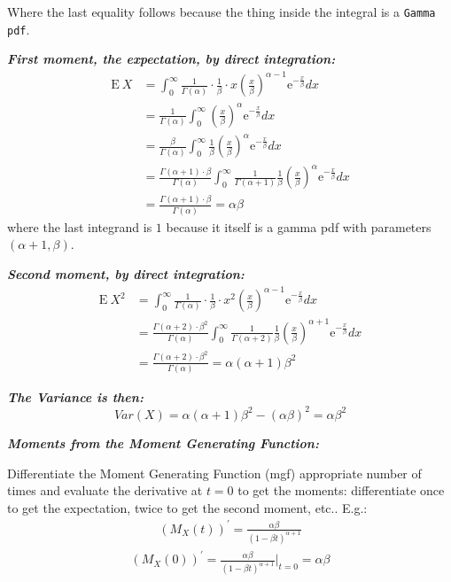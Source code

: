 \documentclass[12pt]{article}
\begin{document}
Where the last equality follows because the thing inside the integral is a \texttt{Gamma} \texttt{pdf}. 
 
 \textbf{\color{TealBlue}\emph{First moment, the expectation, by direct integration:} } 
\begin{align*}
 \mathrm{E} \: X &= \int_0^{\infty}  \frac{1}{\Gamma({\alpha})} \cdot \frac{1}{\beta} \cdot x  \left( \frac{x}{\beta}\right)^{\alpha - 1} \mathrm{e}^{-\frac{x}{\beta}} dx \\
&=   \frac{1}{\Gamma({\alpha})} \int_0^{\infty} \left( \frac{x}{\beta}\right)^{\alpha} \mathrm{e}^{-\frac{x}{\beta}} dx \\
&=   \frac{\beta}{\Gamma({\alpha})} \int_0^{\infty} \frac{1}{\beta} \left( \frac{x}{\beta}\right)^{\alpha} \mathrm{e}^{-\frac{x}{\beta}} dx \\
&=   \frac{ \Gamma({\alpha} + 1) \cdot \beta }{\Gamma({\alpha})} \int_0^{\infty} \frac{1}{\Gamma(\alpha + 1)} \frac{1}{\beta} \left( \frac{x}{\beta}\right)^{\alpha} \mathrm{e}^{-\frac{x}{\beta}} dx \\   
&=  \frac{ \Gamma({\alpha} + 1) \cdot \beta }{\Gamma({\alpha})}  = \alpha\beta
\end{align*}
where the last integrand is $1$ because it itself is a gamma pdf with parameters $(\alpha + 1, \beta)$. 


\bigskip

 \textbf{\color{TealBlue}\emph{Second moment, by direct integration:} } 
\begin{align*}
 \mathrm{E} \: X^2 &= \int_0^{\infty}  \frac{1}{\Gamma({\alpha})} \cdot \frac{1}{\beta} \cdot x^2  \left( \frac{x}{\beta}\right)^{\alpha - 1} \mathrm{e}^{-\frac{x}{\beta}} dx \\
&=   \frac{\Gamma(\alpha + 2) \cdot \beta^2}{\Gamma({\alpha})} \int_0^{\infty} \frac{1}{\Gamma(\alpha + 2)} \frac{1}{\beta} \left( \frac{x}{\beta}\right)^{\alpha +1 } \mathrm{e}^{-\frac{x}{\beta}} dx \\
&=  \frac{ \Gamma({\alpha} + 2) \cdot \beta^2 }{\Gamma({\alpha})}  = \alpha (\alpha + 1) \beta^2
\end{align*}

\textbf{\color{TealBlue}\emph{The Variance is then:} } 
$$
Var(X) = \alpha (\alpha + 1) \beta^2 - (\alpha \beta)^2 = \alpha \beta^2
$$

\textbf{\color{TealBlue}\emph{Moments from the Moment Generating Function:} } 

Differentiate the Moment Generating Function (mgf) appropriate number of times and evaluate the derivative at $t = 0$ to get the moments: differentiate once to get the expectation, twice to get the second moment, etc.. E.g.:
\begin{align*}
(M_X(t))^{'} = \frac{\alpha \beta} { (1 - \beta t)^{\alpha + 1}}  
\end{align*}
\begin{align*}
(M_X(0))^{'} =  \frac{\alpha \beta} { (1 - \beta t)^{\alpha + 1}}  \Big | _{t=0} = \alpha \beta
\end{align*}
\end{document}
